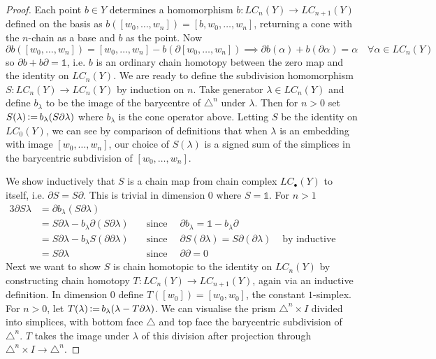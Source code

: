 \documentclass[11pt,a4paper,twoside]{article}
\theoremstyle{plain}
\theoremstyle{definition}
\theoremstyle{definition}
\theoremstyle{definition}
\theoremstyle{definition}
\theoremstyle{definition}
\DeclareMathOperator{\coloneqq}{\vcentcolon=}
\begin{document}
\begin{proof}
Each point $b\in Y$ determines a homomorphism $b\!:\!LC_n(Y)\!\longrightarrow\!LC_{n\!+\!1}(Y)$ defined on the basis as $b([w_0,\dots,w_n])=[b,w_0,\dots,w_n]$, returning a cone with the $n$-chain as a base and $b$ as the point. Now
$$\partial b([w_0,\dots,w_n])\!=\![w_0,\dots,w_n]\!-\!b(\partial[w_0,\dots,w_n]) \implies \partial b(\alpha)+b(\partial\alpha)\!=\!\alpha\quad\forall\alpha\in LC_n(Y)$$
so $\partial b + b\partial = \mathbb{1}$, i.e. $b$ is an ordinary chain homotopy between the zero map and the identity on $LC_n(Y)$. We are ready to define the subdivision homomorphism $S\!:\!LC_n(Y)\!\longrightarrow\!LC_n(Y)$ by induction on $n$. Take generator $\lambda\in LC_n(Y)$ and define $b_\lambda$ to be the image of the barycentre of $\triangle^n$ under $\lambda$. Then for $n>0$ set $S(\lambda)\coloneqq b_\lambda(S\partial\lambda)$ where $b_\lambda$ is the cone operator above. Letting $S$ be the identity on $LC_0(Y)$, we can see by comparison of definitions that when $\lambda$ is an embedding with image $[w_0,\dots,w_n]$, our choice of $S(\lambda)$ is a signed sum of the simplices in the barycentric subdivision of $[w_0,\dots,w_n]$.

We show inductively that $S$ is a chain map from chain complex $LC_\bullet(Y)$ to itself, i.e. $\partial S=S\partial$. This is trivial in dimension $0$ where $S\!=\!\mathbb{1}$. For $n>1$
\begin{alignat*}{3}
\partial S\lambda & = \partial b_\lambda(S\partial\lambda)\\
& = S\partial\lambda -  b_\lambda\partial (S\partial\lambda) \quad &\text{since }& \, \partial b_\lambda=\mathbb{1}-b_\lambda\partial \\
&=S\partial\lambda-b_\lambda S(\partial\partial\lambda) \quad & \text{since }&\, \partial S(\partial\lambda)=S\partial(\partial\lambda)  & \text{ by inductive assumption}\\
&=S\partial\lambda \quad & \text{since }& \, \partial\partial=0 
\end{alignat*}
Next we want to show $S$ is chain homotopic to the identity on $LC_n(Y)$ by constructing chain homotopy $T\!:\!LC_n(Y)\!\longrightarrow LC_{n\!+\!1}(Y)$, again via an inductive definition. In dimension $0$ define $T([w_0])=[w_0,w_0]$, the constant $1$-simplex. For $n>0$, let $T(\lambda)\coloneqq b_\lambda(\lambda-T\partial\lambda)$. We can visualise the prism $\triangle^n\times I$ divided into simplices, with bottom face $\triangle$ and top face the barycentric subdivision of $\triangle^n$. $T$ takes the image under $\lambda$ of this division after projection through $\triangle^n\times I\longrightarrow\triangle^n$.


\end{proof}
\end{document}
